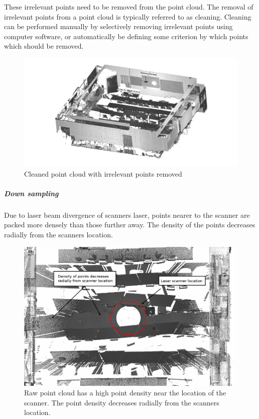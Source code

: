 \documentclass[11pt,a4paper]{report}
\begin{document}
						These irrelevant points need to be removed from the point cloud. The removal of irrelevant points from a point cloud is typically referred to as cleaning.
						Cleaning can be performed manually by selectively removing irrelevant points using computer software, or automatically be defining some criterion by which points which should be removed.
					
						\begin{figure}[H]
							\centering
							\includegraphics[width=1\textwidth]{cleaned_point_cloud}
							\caption[Cleaned point cloud]{Cleaned point cloud with irrelevant points removed}
							\label{fig:cleaned_point_cloud}
						\end{figure}
						
					\subparagraph{Down sampling}
						Due to laser beam divergence of scanners laser, points nearer to the scanner are packed more densely than those further away. The density of the points decreases radially from the scanners location.
						
						\begin{figure}[H]
							\centering
							\includegraphics[width=1\textwidth]{dense_point_cloud}
							\caption[Dense point cloud]{Raw point cloud has a high point density near the location of the scanner. The point density decreases radially from the scanners location.}
							\label{fig:dense_point_cloud}
						\end{figure}
						
\end{document}
